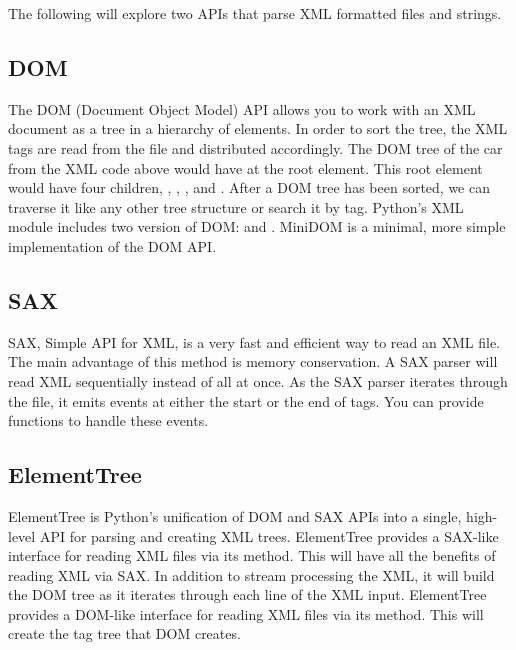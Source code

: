 The following will explore two APIs that parse XML formatted files and strings.

\subsection*{DOM} %

The DOM (Document Object Model) API allows you to work with an XML document as a tree in a hierarchy of elements.
In order to sort the tree, the XML tags are read from the file and distributed accordingly.
The DOM tree of the car from the XML code above would have  at the root element.
This root element would have four children, , , , and .
After a DOM tree has been sorted, we can traverse it like any other tree structure or search it by tag.
Python's XML module includes two version of DOM:  and .
MiniDOM is a minimal, more simple implementation of the DOM API.

\subsection*{SAX} %

SAX, Simple API for XML, is a very fast and efficient way to read an XML file.
The main advantage of this method is memory conservation.
A SAX parser will read XML sequentially instead of all at once.
As the SAX parser iterates through the file, it emits events at either the start or the end of tags.
You can provide functions to handle these events.

\subsection*{ElementTree} %

ElementTree is Python's unification of DOM and SAX APIs into a single, high-level API for parsing and creating XML trees.
ElementTree provides a SAX-like interface for reading XML files via its  method.
This will have all the benefits of reading XML via SAX.
In addition to stream processing the XML, it will build the DOM tree as it iterates through each line of the XML input.
ElementTree provides a DOM-like interface for reading XML files via its  method.
This will create the tag tree that DOM creates.

